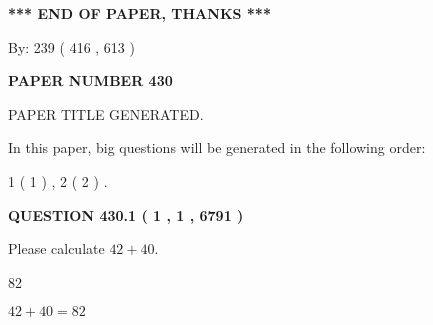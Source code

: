 \documentclass[12pt]{article}
\begin{document}
   
\vspace{1.0in} 
{\textbf{\large{ *** END OF PAPER, THANKS *** }}} 
   
   
\hspace{1.0in} By: 
 239 ( 416 ,  613 )
   
   
   
   
\newpage 
\setcounter{page}{ 
   430001 } 
   
   
   
   
 {\textbf{ \Large{ PAPER NUMBER  430  }}}
   
   
\vspace{0.2in}
   
   
   
   
   
   
   
   
 \vspace{0.2in}
 
 
 
 
   
   
 PAPER TITLE GENERATED.
   
   
   
\vspace{0.2in}
   
In this paper, big questions will be generated in the following order: 
   
   
   1 ( 1 )
 ,
   2 ( 2 )
 .
  
\vspace{0.2in}
  
{\textbf{\Large{QUESTION
430.1 
 ( 1 , 1 , 6791 )
}}}
  
  
 
Please calculate $ %
42 +  %
40 $.
 
 
 
\noindent{}
 
 

82
 
 
\noindent{}
 
 

 
 
 
\noindent{}
 
 

$ %
42 +  %
40=   %
82$
 
\end{document}
